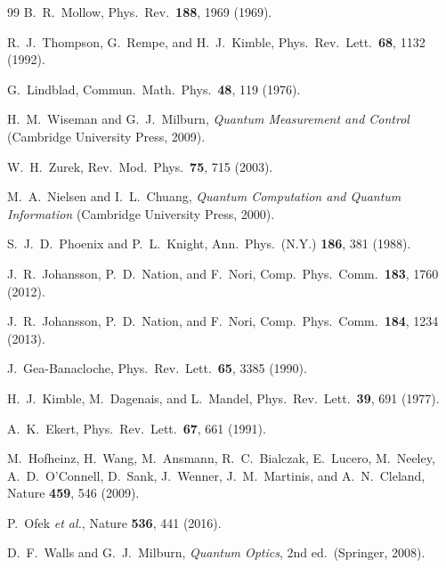 \documentclass[%
 reprint,
 amsmath,amssymb,
 aps,
]{revtex4-2}
\begin{document}
\begin{thebibliography}{99}
B.~R.~Mollow, Phys.\ Rev.\ \textbf{188}, 1969 (1969).

R.~J.~Thompson, G.~Rempe, and H.~J.~Kimble, Phys.\ Rev.\ Lett.\ \textbf{68}, 1132 (1992).

G.~Lindblad, Commun.\ Math.\ Phys.\ \textbf{48}, 119 (1976).

H.~M.~Wiseman and G.~J.~Milburn, \textit{Quantum Measurement and Control} (Cambridge University Press, 2009).

W.~H.~Zurek, Rev.\ Mod.\ Phys.\ \textbf{75}, 715 (2003).

M.~A.~Nielsen and I.~L.~Chuang, \textit{Quantum Computation and Quantum Information} (Cambridge University Press, 2000).

S.~J.~D.~Phoenix and P.~L.~Knight, Ann.\ Phys.\ (N.Y.) \textbf{186}, 381 (1988).

J.~R.~Johansson, P.~D.~Nation, and F.~Nori, Comp.\ Phys.\ Comm.\ \textbf{183}, 1760 (2012).

J.~R.~Johansson, P.~D.~Nation, and F.~Nori, Comp.\ Phys.\ Comm.\ \textbf{184}, 1234 (2013).

J.~Gea-Banacloche, Phys.\ Rev.\ Lett.\ \textbf{65}, 3385 (1990).

H.~J.~Kimble, M.~Dagenais, and L.~Mandel, Phys.\ Rev.\ Lett.\ \textbf{39}, 691 (1977).

A.~K.~Ekert, Phys.\ Rev.\ Lett.\ \textbf{67}, 661 (1991).

M.~Hofheinz, H.~Wang, M.~Ansmann, R.~C.~Bialczak, E.~Lucero, M.~Neeley, A.~D.~O'Connell, D.~Sank, J.~Wenner, J.~M.~Martinis, and A.~N.~Cleland, Nature \textbf{459}, 546 (2009).

P.~Ofek \textit{et al.}, Nature \textbf{536}, 441 (2016).

D.~F.~Walls and G.~J.~Milburn, \textit{Quantum Optics}, 2nd ed.\ (Springer, 2008).

\end{thebibliography}
\end{document}
